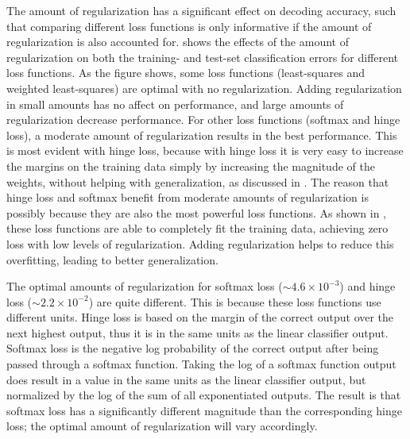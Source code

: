 The amount of regularization has a significant effect on decoding accuracy,
such that comparing different loss functions is only informative
if the amount of regularization is also accounted for.
 shows the effects of the amount of regularization
on both the training- and test-set classification errors
for different loss functions.
As the figure shows,
some loss functions (least-squares and weighted least-squares)
are optimal with no regularization.
Adding regularization in small amounts has no affect on performance,
and large amounts of regularization decrease performance.
For other loss functions (softmax and hinge loss),
a moderate amount of regularization results in the best performance.
This is most evident with hinge loss,
because with hinge loss it is very easy to increase the margins
on the training data simply by increasing the magnitude of the weights,
without helping with generalization, as discussed in .
The reason that hinge loss and softmax
benefit from moderate amounts of regularization
is possibly because they are also the most powerful loss functions.
As shown in ,
these loss functions are able to completely fit the training data,
achieving zero loss with low levels of regularization.
Adding regularization helps to reduce this overfitting,
leading to better generalization.

The optimal amounts of regularization for softmax loss ($\sim 4.6\times10^{-3}$)
and hinge loss ($\sim 2.2\times10^{-2}$) are quite different.
This is because these loss functions use different units.
Hinge loss is based on the margin of the correct output over the next highest output,
thus it is in the same units as the linear classifier output.
Softmax loss is the negative log probability of the correct output
after being passed through a softmax function.
Taking the log of a softmax function output
does result in a value in the same units as the linear classifier output,
but normalized by the log of the sum of all exponentiated outputs.
The result is that softmax loss has a significantly different magnitude
than the corresponding hinge loss;
the optimal amount of regularization will vary accordingly.


